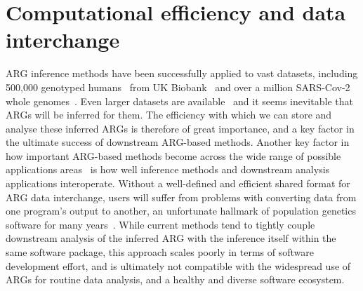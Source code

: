 \documentclass{article}
\begin{document}
\section*{Computational efficiency and data interchange}
ARG inference methods have been successfully applied to vast datasets,
including 500,000 genotyped humans~\citep{kelleher2019inferring,zhang2023biobank}
from UK Biobank~\citep{bycroft2018genome}
and over a million SARS-Cov-2 whole genomes~\citep{zhan2023towards}.
Even larger datasets are
available~\citep[e.g.][]{halldorsson2022sequences} %
and it seems inevitable that ARGs will be inferred for them.
The efficiency with which we can store and analyse these inferred
ARGs is therefore of great importance, and a key factor
in the ultimate success of downstream ARG-based methods.
Another key factor in how important ARG-based methods become
across the wide range of possible applications
areas~\citep{rasmussen2014genome,harris2019database,
hejase2020summary,schaefer2021ancestral,
fan2022genealogical,wohns2022unified,harris2023using,
nowbandegani2023extremely,ignatieva2023distribution}
is how well inference methods and downstream analysis applications
interoperate. Without a well-defined and efficient shared format
for ARG data interchange,
users will suffer from problems with converting data from one program's
output to another, an unfortunate hallmark of population genetics
software for many years~\citep{excoffier2006computer}.
While current methods tend to tightly couple downstream analysis
of the inferred ARG with the inference
itself within the same software package,
this approach scales poorly in terms of software development
effort, and is ultimately not compatible with the widespread use
of ARGs for routine data analysis, and a healthy and diverse
software ecosystem.
\end{document}
